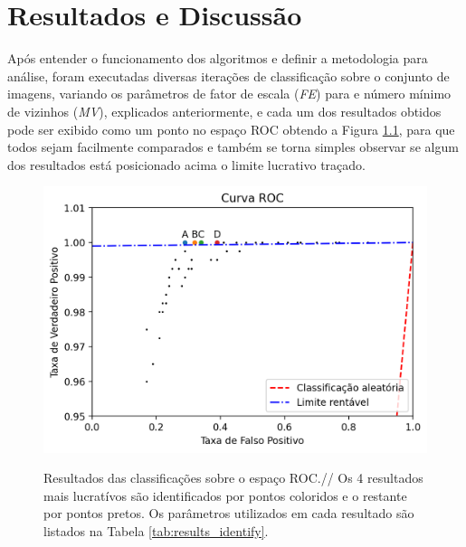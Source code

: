 \chapter{Resultados e Discussão}\label{cap:resultados}

Após entender o funcionamento dos algoritmos e definir a metodologia para análise, foram executadas diversas iterações de classificação sobre o conjunto de imagens, variando os parâmetros de fator de escala (\textit{FE}) para e número mínimo de vizinhos (\textit{MV}), explicados anteriormente, e cada um dos resultados obtidos pode ser exibido como um ponto no espaço ROC obtendo a Figura \ref{fig:results_roc}, para que todos sejam facilmente comparados e também se torna simples observar se algum dos resultados está posicionado acima o limite lucrativo traçado.

\begin{figure}[htbp]
    \centering
    \caption{Resultados das classificações sobre o espaço ROC.//
        Os 4 resultados mais lucratívos são identificados por pontos coloridos e o restante por pontos pretos. Os parâmetros utilizados em cada resultado são listados na Tabela \ref{tab:results_identify}.}
    \includegraphics[scale=1]{figs/curva_roc_results.png}
    \label{fig:results_roc}
\end{figure}

